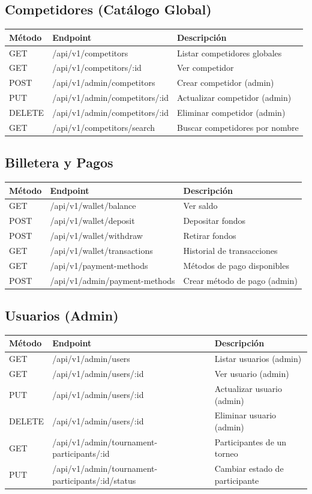 \documentclass[12pt,a4paper]{article}
\begin{document}
\subsection{Competidores (Catálogo Global)}
\begin{tabular}{|l|l|p{6cm}|}
\hline
\textbf{Método} & \textbf{Endpoint} & \textbf{Descripción} \\
\hline
GET & /api/v1/competitors & Listar competidores globales \\
GET & /api/v1/competitors/:id & Ver competidor \\
POST & /api/v1/admin/competitors & Crear competidor (admin) \\
PUT & /api/v1/admin/competitors/:id & Actualizar competidor (admin) \\
DELETE & /api/v1/admin/competitors/:id & Eliminar competidor (admin) \\
GET & /api/v1/competitors/search & Buscar competidores por nombre \\
\end{tabular}

\subsection{Billetera y Pagos}
\begin{tabular}{|l|l|p{6cm}|}
\hline
\textbf{Método} & \textbf{Endpoint} & \textbf{Descripción} \\
\hline
GET & /api/v1/wallet/balance & Ver saldo \\
POST & /api/v1/wallet/deposit & Depositar fondos \\
POST & /api/v1/wallet/withdraw & Retirar fondos \\
GET & /api/v1/wallet/transactions & Historial de transacciones \\
GET & /api/v1/payment-methods & Métodos de pago disponibles \\
POST & /api/v1/admin/payment-methods & Crear método de pago (admin) \\
\end{tabular}

\subsection{Usuarios (Admin)}
\begin{tabular}{|l|l|p{6cm}|}
\hline
\textbf{Método} & \textbf{Endpoint} & \textbf{Descripción} \\
\hline
GET & /api/v1/admin/users & Listar usuarios (admin) \\
GET & /api/v1/admin/users/:id & Ver usuario (admin) \\
PUT & /api/v1/admin/users/:id & Actualizar usuario (admin) \\
DELETE & /api/v1/admin/users/:id & Eliminar usuario (admin) \\
GET & /api/v1/admin/tournament-participants/:id & Participantes de un torneo \\
PUT & /api/v1/admin/tournament-participants/:id/status & Cambiar estado de participante \\
\end{tabular}
\end{document}
